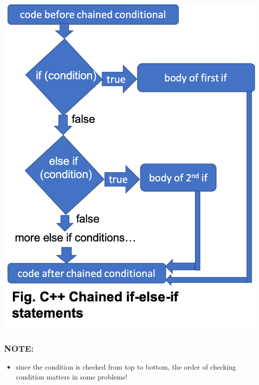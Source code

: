 \documentclass[11pt]{article}
\providecommand{\tightlist}{%
      \setlength{\itemsep}{0pt}\setlength{\parskip}{0pt}}
\begin{document}
\includegraphics{resources/multi-wayselector.png}

\hypertarget{note}{%
\subsubsection{NOTE:}\label{note}}

\begin{itemize}
\tightlist
\item
  since the condition is checked from top to bottom, the order of
  checking condition matters in some problems!
\end{itemize}
\end{document}
